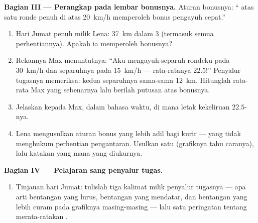 \begin{problem}
\medskip\noindent\textbf{Bagian III --- Perangkap pada lembar bonusnya.}
Aturan bonusnya: `` atas satu ronde penuh di atas
\qty{20}{km/h} memperoleh bonus pengayuh cepat.''
\begin{enumerate}[resume]
  \item Hari Jumat penuh milik Lena: \qty{37}{km} dalam $3$ 
        (termasuk semua perhentiannya). Apakah ia memperoleh bonusnya?
  \item Rekannya Max menuntutnya: ``Aku mengayuh separuh rondeku pada
        \qty{30}{km/h} dan separuhnya pada \qty{15}{km/h} ---
        rata-ratanya $22.5$!'' Penyalur tugasnya memeriksa: kedua
        separuhnya sama-sama \qty{12}{km}. Hitunglah rata-rata Max
        yang sebenarnya lalu berilah putusan atas bonusnya.
  \item Jelaskan kepada Max, dalam bahasa waktu, di mana letak
        kekeliruan $22.5$-nya.
  \item Lena mengusulkan aturan bonus yang lebih adil bagi kurir ---
        yang tidak menghukum perhentian pengantaran. Usulkan satu
        (grafiknya tahu caranya), lalu katakan  yang mana yang
        diukurnya.
\end{enumerate}

\medskip\noindent\textbf{Bagian IV --- Pelajaran sang penyalur tugas.}
\begin{enumerate}[resume]
  \item Tinjauan hari Jumat: tulislah tiga kalimat milik penyalur
        tugasnya --- apa arti bentangan yang lurus, bentangan yang
        mendatar, dan bentangan yang lebih curam pada grafiknya
        masing-masing --- lalu satu peringatan tentang merata-ratakan
        .
\end{enumerate}
\end{problem}
